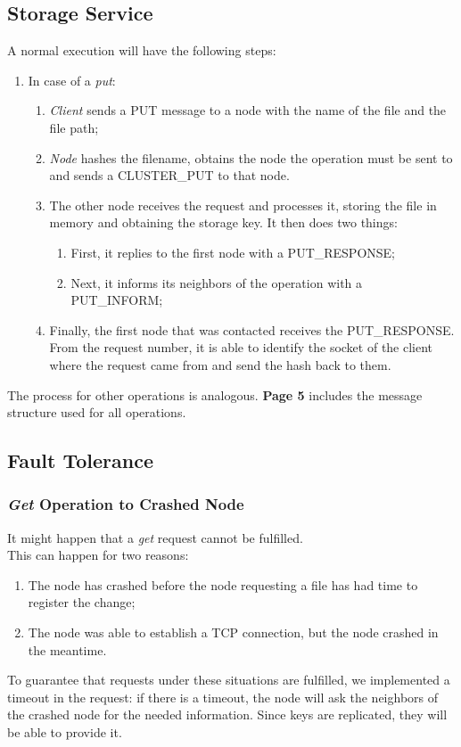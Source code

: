 \documentclass{article}
\begin{document}
\begin{multicols}{2}
	\section{Storage Service}
	A normal execution will have the following steps:
	\begin{enumerate}
	    \item In case of a \textit{put}:
	    \begin{enumerate}
	        \item \textit{Client} sends a PUT message to a node with the name of the file and the file path;
	        \item \textit{Node} hashes the filename, obtains the node the operation must be sent to and sends a CLUSTER\_PUT to that node.
	        \item The other node receives the request and processes it, storing the file in memory and obtaining the storage key. It then does two things:
	        \begin{enumerate}
	            \item First, it replies to the first node with a PUT\_RESPONSE;
	            \item Next, it informs its neighbors of the operation with a PUT\_INFORM;
	        \end{enumerate}
	        \item Finally, the first node that was contacted receives the PUT\_RESPONSE. From the request number, it is able to identify the socket of the client where the request came from and send the hash back to them.
	    \end{enumerate}
	\end{enumerate}
	The process for other operations is analogous. \textbf{Page 5} includes the message structure used for all operations.
	
	\subsection{Fault Tolerance}
	\subsubsection{\textit{Get} Operation to Crashed Node}
    It might happen that a \textit{get} request cannot be fulfilled. \\
    
    This can happen for two reasons:
    \begin{enumerate}
        \item The node has crashed before the node requesting a file has had time to register the change;
        \item The node was able to establish a TCP connection, but the node crashed in the meantime.
    \end{enumerate}
    To guarantee that requests under these situations are fulfilled, we implemented a timeout in the request: if there is a timeout, the node will ask the neighbors of the crashed node for the needed information. Since keys are replicated, they will be able to provide it.


\end{multicols}
\end{document}

